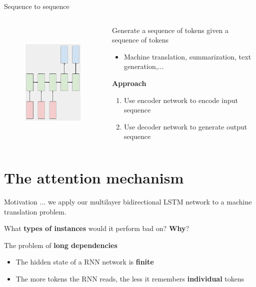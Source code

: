 \documentclass[12pt,aspectratio=169,handout]{beamer}
\begin{document}
\begin{frame}{Sequence to sequence}
	\begin{columns}[T] %
		\begin{column}{.49\textwidth}
		
			\begin{figure}[h]
			\includegraphics[height=6cm]{seq2seq.pdf}
		\end{figure}
		
		\end{column}
		\begin{column}{.49\textwidth}
			\vspace{1cm}
			Generate a sequence of tokens given a sequence of tokens
			\begin{itemize}
				\item Machine translation, summarization, text generation,...
			\end{itemize}
			\textbf{Approach}
			\begin{enumerate}
				\item Use encoder network to encode input sequence
				\item Use decoder network to generate output sequence
			\end{enumerate}
		\end{column}
	\end{columns}

\end{frame}

\section{The attention mechanism}

\begin{frame}{Motivation}
... we apply our multilayer bidirectional LSTM network to a machine translation problem.

What \textbf{types of instances} would it perform bad on? \textbf{Why}?

\vspace{1em}
\pause
The problem of \textbf{long dependencies}
\begin{itemize}
		\item The hidden state of a RNN network is \textbf{finite}
		\item The more tokens the RNN reads, the less it remembers \textbf{individual} tokens
	\end{itemize}

\end{frame}
\end{document}
